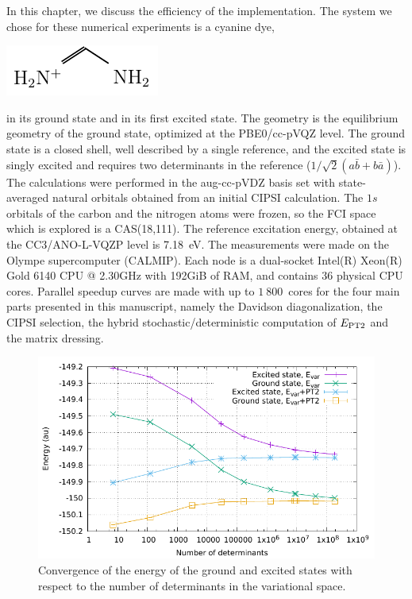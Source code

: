 \documentclass[./thesis.tex]{subfiles}
\begin{document}
\label{chap:PERF}

In this chapter, we discuss the efficiency of the implementation. The system
we chose for these numerical experiments is a cyanine dye, \\
\begin{center}
\includegraphics[]{figures/perf/Cyanine} \\
\end{center}
in its ground state and in its first excited state.
The geometry is the equilibrium geometry of the ground state, optimized at the
PBE0/cc-pVQZ level. The ground state is a closed shell, well described by a
single reference, and the excited state is singly excited and requires two
determinants in the reference ($1/\sqrt{2} (a\bar{b} + b\bar{a})$).  The
calculations were performed in the aug-cc-pVDZ basis set with state-averaged
natural orbitals obtained from an initial CIPSI calculation.
The $1s$ orbitals of the carbon and the nitrogen atoms were frozen, so
the FCI space which is explored is a CAS(18,111). The reference excitation
energy, obtained at the CC3/ANO-L-VQZP level is 7.18~eV.\cite{Send_2011}
The measurements were made on the Olympe supercomputer (CALMIP). Each node is 
a dual-socket Intel(R) Xeon(R) Gold 6140 CPU @ 2.30GHz with 192GiB of RAM, and
contains 36 physical CPU cores. Parallel speedup curves are made with up to
$1~800$~cores for the four main parts presented in this manuscript, namely the
Davidson diagonalization, the CIPSI selection, the hybrid
stochastic/deterministic computation of $E_\text{PT2}$ and the matrix dressing.

\begin{figure}[hbt]
	\begin{center}
		\includegraphics[width=0.8\columnwidth]{figures/perf/cn3_energy}
		\caption{Convergence of the energy of the ground and excited states with respect to the number of determinants in the variational space.}
		\label{fig:energy_pt2}
	\end{center}
\end{figure}
\end{document}
